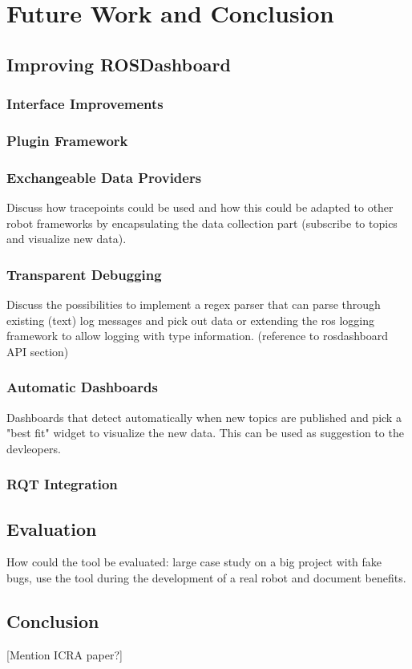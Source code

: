 \chapter{Future Work and Conclusion}
\label{future_work}

\section{Improving ROSDashboard}
\subsection{Interface Improvements}
\subsection{Plugin Framework}
\subsection{Exchangeable Data Providers}
Discuss how tracepoints could be used and how this could be adapted to other robot frameworks by encapsulating the data collection part (subscribe to topics and visualize new data).
\subsection{Transparent Debugging}
Discuss the possibilities to implement a regex parser that can parse through existing (text) log messages and pick out data or extending the ros logging framework to allow logging with type information. (reference to rosdashboard API section)
\subsection{Automatic Dashboards}
Dashboards that detect automatically when new topics are published and pick a "best fit" widget to visualize the new data. This can be used as suggestion to the devleopers.
\subsection{RQT Integration}

\section{Evaluation}
How could the tool be evaluated: large case study on a big project with fake bugs, use the tool during the development of a real robot and document benefits.

\section{Conclusion}

[Mention ICRA paper?]
